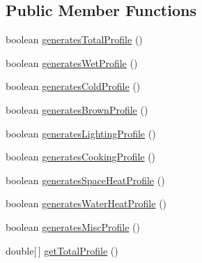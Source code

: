 \subsection*{Public Member Functions}
\begin{DoxyCompactItemize}
\item 
boolean \hyperlink{classuk_1_1ac_1_1dmu_1_1iesd_1_1cascade_1_1util_1_1profilegenerators_1_1_melody_stokes_generator_ac9d0e96f0a359079d72212b44213278a}{generates\-Total\-Profile} ()
\item 
boolean \hyperlink{classuk_1_1ac_1_1dmu_1_1iesd_1_1cascade_1_1util_1_1profilegenerators_1_1_melody_stokes_generator_a0fcf520b5342a8f67a7e30df30ef86ef}{generates\-Wet\-Profile} ()
\item 
boolean \hyperlink{classuk_1_1ac_1_1dmu_1_1iesd_1_1cascade_1_1util_1_1profilegenerators_1_1_melody_stokes_generator_a535f8fbe41af34abd67348c8088ba580}{generates\-Cold\-Profile} ()
\item 
boolean \hyperlink{classuk_1_1ac_1_1dmu_1_1iesd_1_1cascade_1_1util_1_1profilegenerators_1_1_melody_stokes_generator_a1adfb4892c460a8b690d8a37e4b84cd7}{generates\-Brown\-Profile} ()
\item 
boolean \hyperlink{classuk_1_1ac_1_1dmu_1_1iesd_1_1cascade_1_1util_1_1profilegenerators_1_1_melody_stokes_generator_a3c50b80a57f6e51240b3528fd8c6c3ef}{generates\-Lighting\-Profile} ()
\item 
boolean \hyperlink{classuk_1_1ac_1_1dmu_1_1iesd_1_1cascade_1_1util_1_1profilegenerators_1_1_melody_stokes_generator_a922cb8b8e8323b9e6ab7d2aff55311d8}{generates\-Cooking\-Profile} ()
\item 
boolean \hyperlink{classuk_1_1ac_1_1dmu_1_1iesd_1_1cascade_1_1util_1_1profilegenerators_1_1_melody_stokes_generator_a2e3cef31a1972a8f4356801ca68e2fe0}{generates\-Space\-Heat\-Profile} ()
\item 
boolean \hyperlink{classuk_1_1ac_1_1dmu_1_1iesd_1_1cascade_1_1util_1_1profilegenerators_1_1_melody_stokes_generator_a9cd5ead3ef58dfe13dd94eab04094956}{generates\-Water\-Heat\-Profile} ()
\item 
boolean \hyperlink{classuk_1_1ac_1_1dmu_1_1iesd_1_1cascade_1_1util_1_1profilegenerators_1_1_melody_stokes_generator_a1aa4f11583d5eb019aff082e00860e1f}{generates\-Misc\-Profile} ()
\item 
double\mbox{[}$\,$\mbox{]} \hyperlink{classuk_1_1ac_1_1dmu_1_1iesd_1_1cascade_1_1util_1_1profilegenerators_1_1_melody_stokes_generator_a4bf6684963d57449566f0635fa186138}{get\-Total\-Profile} ()
\item 

\end{DoxyCompactItemize}
